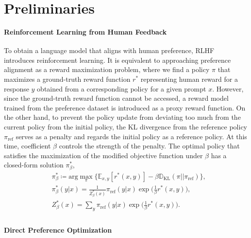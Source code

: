 \section{Preliminaries}

\paragraph{Reinforcement Learning from Human Feedback}

To obtain a language model that aligns with human preference, RLHF~\cite{ziegler2020finetuning} introduces reinforcement learning. It is equivalent to approaching preference alignment as a reward maximization problem, where we find a policy $\pi$ that maximizes a ground-truth reward function $r^*$ representing human reward for a response $y$ obtained from a corresponding policy for a given prompt $x$. However, since the ground-truth reward function cannot be accessed, a reward model trained from the preference dataset is introduced as a proxy reward function. On the other hand, to prevent the policy update from deviating too much from the current policy from the initial policy, the KL divergence from the reference policy $\pi_{\text{ref}}$ serves as a penalty and regards the initial policy as a reference policy. At this time, coefficient $\beta$ controls the strength of the penalty. The optimal policy that satisfies the maximization of the modified objective function under $\beta$ has a closed-form solution $\pi^*_{\beta}$,
\begin{equation*}
\begin{split}
& \pi^*_\beta \coloneqq \text{arg}\max_{\pi} \{ \mathbb{E}_{x, y}[r^*(x, y)] - \beta \mathbb{D}_{\text{KL}} (\pi || \pi_{\text{ref}}) \}, \\
& \pi^*_\beta (y | x) = \frac{1}{Z^*_\beta(x)}\pi_{\text{ref}}(y | x) \exp \big(\frac{1}{\beta}r^*(x, y)\big), \\
& Z^*_\beta(x) = \sum_{y} \pi_{\text{ref}}(y | x) \exp \big(\frac{1}{\beta}r^*(x, y)\big). \\
\end{split}
\end{equation*}

\paragraph{Direct Preference Optimization}

